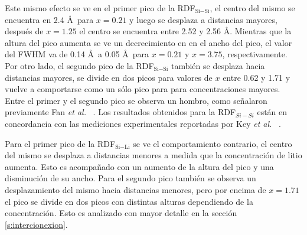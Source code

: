 Este mismo efecto se ve en el primer pico de la RDF$_{\text{Si}-\text{Si}}$, el 
centro del mismo
se encuentra en 2.4 \AA\ para $x = 0.21$ y luego se desplaza a distancias
mayores, después de $x = 1.25$ el centro se encuentra entre 2.52 y 2.56 \AA.
Mientras que la altura del pico aumenta se ve un decrecimiento en en el ancho 
del pico, el valor del FWHM va de 0.14 \AA\ a 0.05 \AA\ para $x = 0.21$ y 
$x = 3.75$, respectivamente. Por otro lado, el segundo pico de la RDF$_{\text{Si}-\text{Si}}$
también se desplaza hacia distancias mayores, se divide en dos picos para valores 
de $x$ entre 0.62 y 1.71 y vuelve a comportarse como un sólo pico para para 
concentraciones mayores. Entre el primer y el segundo pico se observa un hombro,
como señalaron previamente Fan \textit{et al.} ~\cite{fan2013}. Los resultados 
obtenidos para la RDF$_{Si-Si}$ están en concordancia con las mediciones 
experimentales reportadas por Key \textit{et al.} ~\cite{key2011}.

Para el primer pico de la RDF$_{\text{Si}-\text{Li}}$ se ve el comportamiento contrario, el 
centro del mismo se desplaza a distancias menores a medida que la concentración
de litio aumenta. Esto es acompañado con un aumento de la altura del pico y una
disminución de su ancho. Para el segundo pico también se observa un desplazamiento
del mismo hacia distancias menores, pero por encima de $x = 1.71$ el pico se
divide en dos picos con distintas alturas dependiendo de la concentración. Esto
es analizado con mayor detalle en la sección \ref{s:intercionexion}.
